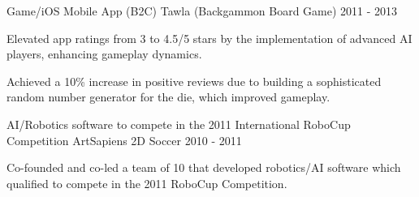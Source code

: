 \begin{cventries}
    


  \cventry
    {Game/iOS Mobile App (B2C)} %
    {Tawla (Backgammon Board Game)} %
    {2011 - 2013} %
    {} %
    {
          \begin{cvitems} %
	          	\item {Elevated app ratings from 3 to 4.5/5 stars by the implementation of advanced AI players, enhancing gameplay dynamics.}
				\item {Achieved a 10\% increase in positive reviews due to building a sophisticated random number generator for the die, which improved gameplay.}
	      \end{cvitems}
    }
    
    



  \cventry
    {AI/Robotics software to compete in the 2011 International RoboCup Competition} %
    {ArtSapiens 2D Soccer} %
    {2010 - 2011} %
    {} %
    {
          \begin{cvitems} %
			\item {Co-founded and co-led a team of 10 that developed robotics/AI software which qualified to compete in the 2011 RoboCup Competition.}%
	      \end{cvitems}
    }
    
    

\end{cventries}
